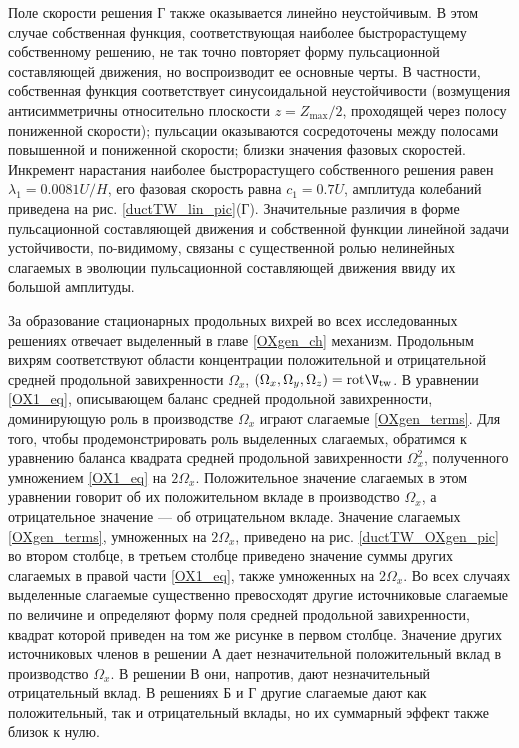 Поле скорости решения Г также оказывается линейно неустойчивым. В этом случае собственная функция, соответствующая наиболее быстрорастущему собственному решению, не так точно повторяет форму пульсационной составляющей движения, но воспроизводит ее основные черты. В частности, собственная функция соответствует синусоидальной неустойчивости (возмущения антисимметричны относительно плоскости $z = Z_\mathrm{max} / 2$, проходящей через полосу пониженной скорости); пульсации оказываются сосредоточены между полосами повышенной и пониженной скорости; близки значения фазовых скоростей. Инкремент нарастания наиболее быстрорастущего собственного решения равен $\lambda_1 = 0.0081U/H$, его фазовая скорость равна $c_1 = 0.7U$, амплитуда колебаний приведена на рис. \ref{ductTW_lin_pic}(Г). Значительные различия в форме пульсационной составляющей движения и собственной функции линейной задачи устойчивости, по-видимому, связаны с существенной ролью нелинейных слагаемых в эволюции пульсационной составляющей движения ввиду их большой амплитуды. 

За образование стационарных продольных вихрей во всех исследованных решениях отвечает выделенный в главе \ref{OXgen_ch} механизм. Продольным вихрям соответствуют области концентрации положительной и отрицательной средней продольной завихренности $\Omega_x$, $(\Omega_x, \Omega_y, \Omega_z) = \mathrm{rot}\V_\mathrm{tw}$. В уравнении \eqref{OX1_eq}, описывающем баланс средней продольной завихренности, доминирующую роль в производстве $\Omega_x$ играют слагаемые \eqref{OXgen_terms}. Для того, чтобы продемонстрировать роль выделенных слагаемых, обратимся к уравнению баланса квадрата средней продольной завихренности $\Omega_x^2$, полученного умножением \eqref{OX1_eq} на $2\Omega_x$. Положительное значение слагаемых в этом уравнении говорит об их положительном вкладе в производство $\Omega_x$, а отрицательное значение --- об отрицательном вкладе. Значение слагаемых \eqref{OXgen_terms}, умноженных на $2\Omega_x$, приведено на рис. \ref{ductTW_OXgen_pic} во втором столбце, в третьем столбце приведено значение суммы других слагаемых в правой части \eqref{OX1_eq}, также умноженных на $2\Omega_x$. Во всех случаях выделенные слагаемые существенно превосходят другие источниковые слагаемые по величине и определяют форму поля средней продольной завихренности, квадрат которой приведен на том же рисунке в первом столбце. Значение других источниковых членов в решении А дает незначительной положительный вклад в производство $\Omega_x$. В решении В они, напротив, дают незначительный отрицательный вклад. В решениях Б и Г другие слагаемые дают как положительный, так и отрицательный вклады, но их суммарный эффект также близок к нулю. 

